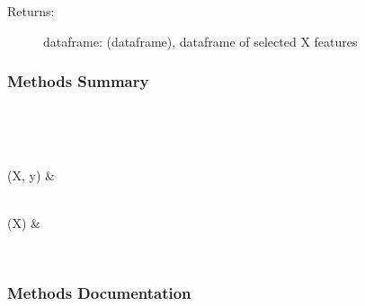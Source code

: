 \documentclass[letterpaper,10pt,english]{sphinxmanual}
\begin{document}
\begin{fulllineitems}
\begin{description}
\begin{description}
\begin{description}
\item[{Returns:}] \leavevmode
dataframe: (dataframe), dataframe of selected X features

\end{description}

\end{description}

\end{description}
\subsubsection*{Methods Summary}


\begin{savenotes}\sphinxatlongtablestart\begin{longtable}[c]{}
\hline

\endfirsthead

%
{}\\
\hline

\endhead

\hline
{}\\
\endfoot

\endlastfoot

{\hyperref[\detokenize{api/mastml.feature_selectors.PearsonSelector:mastml.feature_selectors.PearsonSelector.fit}]{}}(X, y)
&

\\
\hline
{\hyperref[\detokenize{api/mastml.feature_selectors.PearsonSelector:mastml.feature_selectors.PearsonSelector.transform}]{}}(X)
&

\\
\hline
\end{longtable}\sphinxatlongtableend\end{savenotes}
\subsubsection*{Methods Documentation}

\begin{fulllineitems}
\label{\detokenize{api/mastml.feature_selectors.PearsonSelector:mastml.feature_selectors.PearsonSelector.fit}}
\end{fulllineitems}


\end{fulllineitems}
\end{document}
